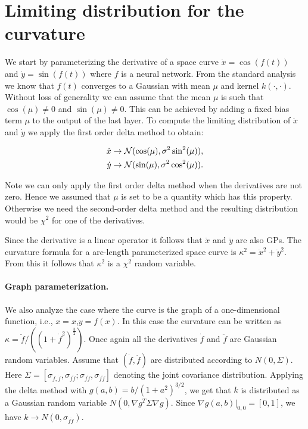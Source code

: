 \section{Limiting distribution for the curvature}

We start by parameterizing the derivative of a space curve $\dot{x} = \cos(f(t))$ 
and $\dot{y} = \sin(f(t))$ where $f$ is a neural network. 
From the standard analysis we know that $f(t)$ converges to a Gaussian with mean $\mu$ and kernel $k(\cdot,\cdot)$. 
Without loss of generality we can assume that the mean $\mu$ is such that $\cos(\mu) \neq 0$ and $\sin(\mu)\neq 0$. 
This can be achieved by adding a fixed bias term $\mu$ to the output of the last layer. 
To compute the limiting distribution of $\ddot{x}$ and $\dot{y}$ we apply the first order delta method to obtain:

\begin{align}
\dot{x} &\rightarrow {\cal N} (\cos(\mu), \sigma^2\sin^2(\mu)), \\
\dot{y} &\rightarrow {\cal N} (\sin(\mu), \sigma^2\cos^2(\mu)). 
\end{align}

Note we can only apply the first order delta method when the derivatives are not zero. 
Hence we assumed that $\mu$ is set to be a quantity which has this property. 
Otherwise we need the second-order delta method and the resulting distribution would be $\chi^2$ for one of the derivatives.

Since the derivative is a linear operator it follows that $\ddot{x}$ and $\ddot{y}$ are also GPs. 
The curvature formula for a arc-length parameterized space curve is $\kappa ^2= \ddot{x}^2 + \ddot{y}^2$. 
From this it follows that $\kappa^2$ is a $\chi^2$ random variable.




\paragraph*{Graph parameterization.}

We also analyze the case where the curve is the graph of a one-dimensional function, i.e., $x=x$,$y=f(x)$. 
In this case the curvature can be written as $\kappa=\ddot{f}/((1+\dot{f}^2)^\frac{3}{2})$. 
Once again all the derivatives $\dot{f}$ and $\ddot{f}$ are Gaussian random variables. 
Assume that $(\dot{f}, \ddot{f})$ are distributed according to $N(0,\Sigma)$. Here $\Sigma = [\sigma_{\dot{f},\dot{f}}, \sigma_{\dot{f}\ddot{f}}; \sigma_{\dot{f}\ddot{f}}, \sigma_{\ddot{f}\ddot{f}} ]$ denoting the joint covariance distribution.
Applying the delta method with $g(a, b) = b/(1+a^2)^{3/2}$, we get that $k$ is distributed as a Gaussian random variable $N(0, \nabla g^T \Sigma \nabla g)$. Since $\nabla g(a, b) |_{0,0} = [0, 1]$, we have $k \rightarrow N(0, \sigma_{\ddot{f}\ddot{f}})$.